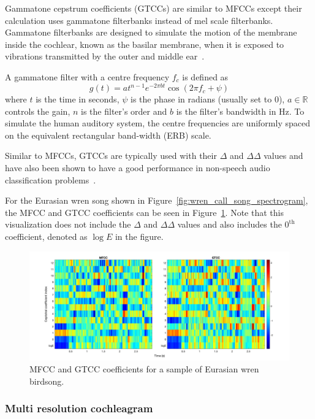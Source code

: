 Gammatone cepstrum coefficients (GTCCs) are similar to MFCCs except their
calculation  uses gammatone filterbanks instead of mel scale filterbanks.
Gammatone filterbanks are designed to simulate the motion of the membrane inside
the cochlear, known as the basilar membrane, when it is exposed to vibrations
transmitted by the outer and middle ear~\cite{patterson1992complex}.

A gammatone filter with a centre frequency $f_c$ is defined as
\begin{equation}
  g(t) = at^{n-1}e^{-2\pi b t} \cos(2\pi f_c + \psi)
\end{equation}
where $t$ is the time in seconds, $\psi$ is the phase in radians (usually set to
0), $a \in \mathbb{R}$ controls the gain, $n$ is the filter's order and $b$ is
the filter's bandwidth in Hz. To simulate the human auditory system, the centre
frequencies are uniformly spaced on the equivalent rectangular band-width (ERB)
scale.

Similar to MFCCs, GTCCs are typically used with their $\Delta$ and $\Delta\Delta$
values and have also been shown to have a good performance in
non-speech audio classification problems~\cite{valero2012gammatone}.

For the Eurasian wren song shown in Figure~\ref{fig:wren_call_song_spectrogram},
the MFCC and GTCC coefficients can be seen in
Figure~\ref{fig:mfcc_gtcc_example}. Note that this visualization does not
include the $\Delta$ and $\Delta\Delta$ values and also includes the
$0^{\text{th}}$ coefficient, denoted as $\log E$ in the figure.

\begin{figure}[ht]
  \centering
  \includegraphics[width=\textwidth]{figures/mfcc_gtcc_example.png}
  \caption{MFCC and GTCC coefficients for a sample of Eurasian wren
  birdsong.}\label{fig:mfcc_gtcc_example}
\end{figure}

\subsubsection{Multi resolution cochleagram}

